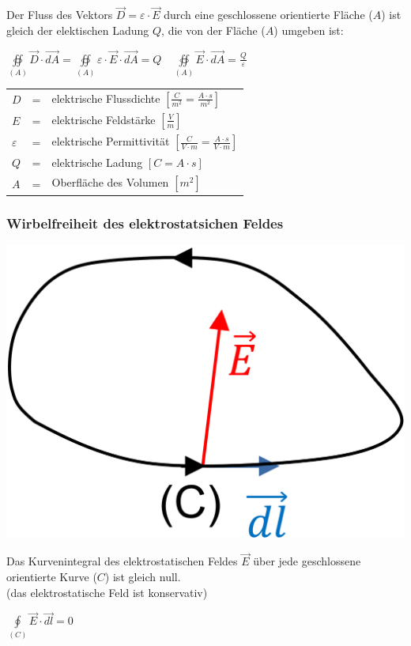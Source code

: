 \begin{minipage}[c]{0.60\columnwidth}
Der Fluss des Vektors $\vec{D} = \varepsilon \cdot \vec{E}$ durch eine geschlossene orientierte Fläche ($A$) ist gleich der elektischen Ladung $Q$, die von der Fläche ($A$) umgeben ist:

    $\boxed{\underset{(A)}{\operatorname*{\oiint}}\vec{D}\cdot\vec{dA} = \underset{(A)}{\operatorname*{\oiint}} \varepsilon \cdot \vec{E}\cdot\vec{dA} = Q} \quad \boxed{\underset{(A)}{\operatorname*{\oiint}}\vec{E}\cdot\vec{dA}=\frac{Q}{\varepsilon}}$

    \begin{tabular}{lll}
        $D$ &=& elektrische Flussdichte $\left[\frac{C}{m^2} = \frac{A \cdot s}{m^2}\right]$\\
        $E$ &=& elektrische Feldstärke $\left[\frac{V}{m}\right]$\\
        $\varepsilon$ &=& elektrische Permittivität $\left[\frac{C}{V \cdot m} = \frac{A \cdot s}{V \cdot m}\right]$\\
        $Q$ &=& elektrische Ladung $\left[C = A \cdot s\right]$\\
        $A$ &=& Oberfläche des Volumen $\left[m^2\right]$
    \end{tabular}
\end{minipage}

\subsubsection{Wirbelfreiheit des elektrostatsichen Feldes}



\begin{minipage}[c]{0.36\columnwidth}
    \includegraphics[width=\columnwidth]{images/V1B1.png}
\end{minipage}
\hfill
\begin{minipage}[c]{0.60\columnwidth}
    Das Kurvenintegral des elektrostatischen Feldes $\vec{E}$ 
    über jede geschlossene orientierte Kurve ($C$) ist 
    gleich null.\\
    (das elektrostatische Feld ist konservativ)

    $\boxed{\underset{(C)}{\operatorname*{\oint}} \vec{E} \cdot\vec{dl} = 0}$
\end{minipage}


